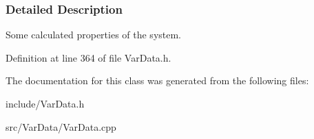 \subsubsection{\-Detailed \-Description}
\-Some calculated properties of the system. 

\-Definition at line 364 of file \-Var\-Data.\-h.



\-The documentation for this class was generated from the following files\-:\begin{DoxyCompactItemize}
\item 
include/\-Var\-Data.\-h\item 
src/\-Var\-Data/\-Var\-Data.\-cpp\end{DoxyCompactItemize}
